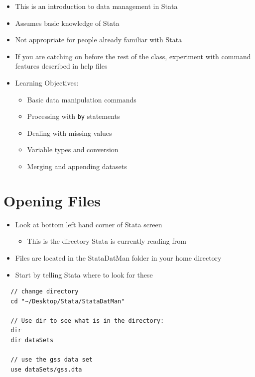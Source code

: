 \documentclass[]{book}
\providecommand{\tightlist}{%
  \setlength{\itemsep}{0pt}\setlength{\parskip}{0pt}}
\begin{document}
\begin{itemize}
\tightlist
\item
  This is an introduction to data management in Stata
\item
  Assumes basic knowledge of Stata
\item
  Not appropriate for people already familiar with Stata
\item
  If you are catching on before the rest of the class, experiment with command features described in help files
\item
  Learning Objectives:

  \begin{itemize}
  \tightlist
  \item
    Basic data manipulation commands
  \item
    Processing with \texttt{by} statements
  \item
    Dealing with missing values
  \item
    Variable types and conversion
  \item
    Merging and appending datasets
  \end{itemize}
\end{itemize}

\hypertarget{opening-files}{%
\section{Opening Files}\label{opening-files}}

\begin{itemize}
\tightlist
\item
  Look at bottom left hand corner of Stata screen

  \begin{itemize}
  \tightlist
  \item
    This is the directory Stata is currently reading from
  \end{itemize}
\item
  Files are located in the StataDatMan folder in your home directory
\item
  Start by telling Stata where to look for these
\end{itemize}

\begin{verbatim}
  // change directory
  cd "~/Desktop/Stata/StataDatMan"

  // Use dir to see what is in the directory:
  dir
  dir dataSets

  // use the gss data set
  use dataSets/gss.dta
\end{verbatim}
\end{document}
